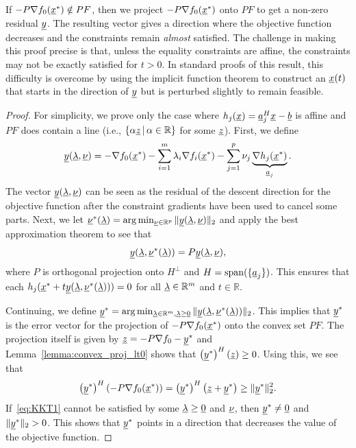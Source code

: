 If $-P \nabla f_0 (\underline{x}^*) \notin P F$, then we project $-P \nabla f_0 (\underline{x}^*)$ onto $PF$ to get a non-zero residual $\underline{y}$.
The resulting vector gives a direction where the objective function decreases and the constraints remain \emph{almost} satisfied.
The challenge in making this proof precise is that, unless the equality constraints are affine, the constraints may not be exactly satisfied for $t>0$.
In standard proofs of this result, this difficulty is overcome by using the implicit function theorem to construct an $\underline{x} (t)$ that starts in the direction of $\underline{y}$ but is perturbed slightly to remain feasible.

\begin{proof}
For simplicity, we prove only the case where $h_j (\underline{x}) = \underline{a}_j^H \underline{x} - \underline{b}$ is affine and $PF$ does contain a line (i.e., $\{\alpha \underline{z}\,|\, \alpha \in \mathbb{R}\}$ for some $\underline{z}$).  First, we define 
\[ \underline{y} (\underline{\lambda},\underline{\nu}) = -\nabla f_0 (\underline{x}^*) - \sum_{i=1}^m \lambda_i \nabla f_i (\underline{x}^*) - \sum_{j=1}^p \nu_j \underbrace{\nabla h_j (\underline{x}^*)}_{\underline{a}_j}. \]
The vector $\underline{y} (\underline{\lambda},\underline{\nu})$ can be seen as the residual of the descent direction for the objective function after the constraint gradients have been used to cancel some parts.
Next, we let $\underline{\nu}^* (\underline{\lambda}) = \arg \min_{\underline{\nu}\in \mathbb{R}^p} \| \underline{y} (\underline{\lambda},\underline{\nu}) \|_2$
and apply the best approximation theorem to see that
\[ \underline{y} (\underline{\lambda},\underline{\nu}^* (\underline{\lambda})) = P \underline{y} (\underline{\lambda},\underline{\nu}), \]
where $P$ is orthogonal projection onto $H^\perp$ and $H = \mathrm{span} ( \{ \underline{a}_j \} )$.
This ensures that each $h_j ( \underline{x}^* + t \underline{y} (\underline{\lambda},\underline{\nu}^* (\underline{\lambda})) )=0$ for all $\underline{\lambda}\in \mathbb{R}^m$ and $t\in \mathbb{R}$.

Continuing, we define $\underline{y}^* = \arg \min_{\underline{\lambda} \in \mathbb{R}^m, \underline{\lambda} \geq \underline{0}} \| \underline{y} (\underline{\lambda},\underline{\nu}^* (\underline{\lambda})) \|_2 $.
This implies that $\underline{y}^*$ is the error vector for the projection of $-P\nabla f_0 (\underline{x}^*)$ onto the convex set $PF$.
The projection itself is given by $\underline{z}=-P\nabla f_0 - \underline{y}^*$ and Lemma~\ref{lemma:convex_proj_lt0} shows that $\left( \underline{y}^* \right)^H \left( \underline{z} \right) \geq 0$.
Using this, we see that
\[ \left( \underline{y}^* \right)^H \left(-P \nabla f_0 (\underline{x}^*) \right)
= \left(\underline{y}^* \right)^H \left(\underline{z}+\underline{y}^* \right)
 \geq \| \underline{y}^* \|_2^2.
\]
If~\eqref{eq:KKT1} cannot be satisfied by some $\underline{\lambda} \geq \underline{0}$ and $\underline{\nu}$, then $\underline{y}^* \neq \underline{0}$ and $\| \underline{y}^* \|_2 > 0$.
This shows that $\underline{y}^*$ points in a direction that decreases the value of the objective function.


\end{proof}
